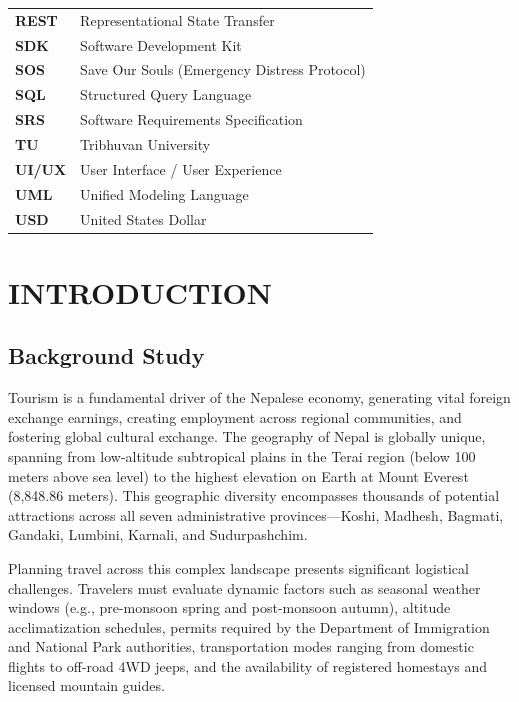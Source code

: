 \documentclass[12pt,a4paper]{report}
\begin{document}
\begin{tabularx}{\textwidth}{l X}
\textbf{REST} & Representational State Transfer \\
\textbf{SDK} & Software Development Kit \\
\textbf{SOS} & Save Our Souls (Emergency Distress Protocol) \\
\textbf{SQL} & Structured Query Language \\
\textbf{SRS} & Software Requirements Specification \\
\textbf{TU} & Tribhuvan University \\
\textbf{UI/UX} & User Interface / User Experience \\
\textbf{UML} & Unified Modeling Language \\
\textbf{USD} & United States Dollar \\
\end{tabularx}

\newpage
{}

\chapter{INTRODUCTION}

\section{Background Study}
Tourism is a fundamental driver of the Nepalese economy, generating vital foreign exchange earnings, creating employment across regional communities, and fostering global cultural exchange. The geography of Nepal is globally unique, spanning from low-altitude subtropical plains in the Terai region (below 100 meters above sea level) to the highest elevation on Earth at Mount Everest (8,848.86 meters). This geographic diversity encompasses thousands of potential attractions across all seven administrative provinces—Koshi, Madhesh, Bagmati, Gandaki, Lumbini, Karnali, and Sudurpashchim.

Planning travel across this complex landscape presents significant logistical challenges. Travelers must evaluate dynamic factors such as seasonal weather windows (e.g., pre-monsoon spring and post-monsoon autumn), altitude acclimatization schedules, permits required by the Department of Immigration and National Park authorities, transportation modes ranging from domestic flights to off-road 4WD jeeps, and the availability of registered homestays and licensed mountain guides.
\end{document}
